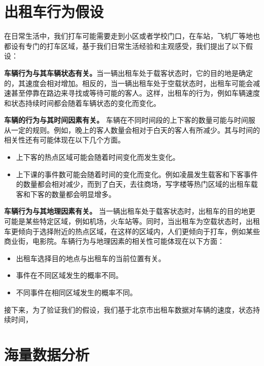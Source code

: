 \section{出租车行为假设}

在日常生活中，我们打车可能需要走到小区或者学校门口，在车站，飞机厂等地也都设有专门的打车区域，基于我们日常生活经验和主观感受，我们提出了以下假设：
\begin{assumption}\label{assuption_1}
\textbf{车辆行为与其车辆状态有关。}当一辆出租车处于载客状态时，它的目的地是确定的，其速度会相对增加。相反的，当一辆出租车处于空载状态时，出租车可能会减速甚至停靠在路边来寻找或等待可能的客人。这样，出租车的行为，例如车辆速度和状态持续时间都会随着车辆状态的变化而变化。
\end{assumption}
\begin{assumption}\label{assuption_2}
\textbf{车辆的行为与其时间因素有关。}
车辆在不同时间段的上下客的数量可能与时间服从一定的规则。例如，晚上的客人数量会相对于白天的客人有所减少。其与时间的相关性还有可能体现在以下几个方面。
\begin{itemize}
\item 上下客的热点区域可能会随着时间变化而发生变化。
\item 上下课的事件数可能会随着时间的变化而变化。例如凌晨发生载客和下客事件的数量都会相对减少，而到了白天，去往商场，写字楼等热门区域的出租车载客和下客的数量都会明显增多。
\end{itemize}
\end{assumption}
\begin{assumption}\label{assuption_3}
\textbf{车辆行为与其地理因素有关。}
当一辆出租车处于载客状态时，出租车的目的地更可能是某些特定区域，例如机场，火车站等。同时，当出租车为空载状态时，出租车更倾向于选择附近的热点区域，在这样的区域内，人们更倾向于打车，例如某些商业街，电影院。车辆行为与地理因素的相关性可能体现在以下方面：
\begin{itemize}
\item 出租车选择目的地点与出租车的当前位置有关。
\item 事件在不同区域发生的概率不同。
\item 不同事件在相同区域发生的概率不同。
\end{itemize}
\end{assumption}

接下来，为了验证我们的假设，我们基于北京市出租车数据对车辆的速度，状态持续时间，

\section{海量数据分析}
